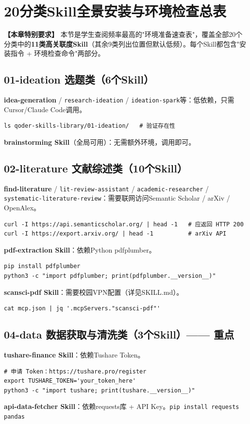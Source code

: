 \section{20分类Skill全景安装与环境检查总表}


\textbf{【本章特别要求】} 本节是学生查阅频率最高的"环境准备速查表"，覆盖全部20个分类中的\textbf{11类高关联度Skill}（其余9类列出位置但默认低频）。每个Skill都包含"安装指令 + 环境检查命令"两部分。

\subsection{01-ideation 选题类（6个Skill）}
\textbf{idea-generation} / \texttt{research-ideation} / \texttt{ideation-spark}等：低依赖，只需Cursor/Claude Code调用。
\begin{lstlisting}[style=shell]
ls qoder-skills-library/01-ideation/   # 验证存在性
\end{lstlisting}
\textbf{brainstorming Skill}（全局可用）：无需额外环境，调用即可。

\subsection{02-literature 文献综述类（10个Skill）}
\textbf{find-literature} / \texttt{lit-review-assistant} / \texttt{academic-researcher} / \texttt{systematic-literature-review}：需要联网访问Semantic Scholar / arXiv / OpenAlex。
\begin{lstlisting}[style=shell]
curl -I https://api.semanticscholar.org/ | head -1   # 应返回 HTTP 200
curl -I https://export.arxiv.org/ | head -1          # arXiv API
\end{lstlisting}
\textbf{pdf-extraction Skill}：依赖Python pdfplumber。
\begin{lstlisting}[style=shell]
pip install pdfplumber
python3 -c "import pdfplumber; print(pdfplumber.__version__)"
\end{lstlisting}
\textbf{scansci-pdf Skill}：需要校园VPN配置（详见SKILL.md）。
\begin{lstlisting}[style=shell]
cat mcp.json | jq '.mcpServers."scansci-pdf"'
\end{lstlisting}

\subsection{04-data 数据获取与清洗类（3个Skill）—— 重点}
\textbf{tushare-finance Skill}：依赖Tushare Token。
\begin{lstlisting}[style=shell]
# 申请 Token：https://tushare.pro/register
export TUSHARE_TOKEN='your_token_here'
python3 -c "import tushare; print(tushare.__version__)"
\end{lstlisting}
\textbf{api-data-fetcher Skill}：依赖requests库 + API Key。\texttt{pip install requests pandas}

